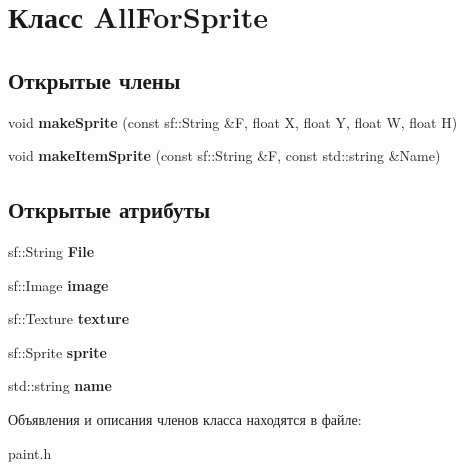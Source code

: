 \hypertarget{classAllForSprite}{}\section{Класс All\+For\+Sprite}
\label{classAllForSprite}
\subsection*{Открытые члены}
\begin{DoxyCompactItemize}
\item 
\mbox{\label{classAllForSprite_ae4498a5572c1e9f71817de7b4601cb02}} 
void {\bfseries make\+Sprite} (const sf\+::\+String \&F, float X, float Y, float W, float H)
\item 
\mbox{\label{classAllForSprite_af9eb7b8946920ca71fd9fc17be5778db}} 
void {\bfseries make\+Item\+Sprite} (const sf\+::\+String \&F, const std\+::string \&Name)
\end{DoxyCompactItemize}
\subsection*{Открытые атрибуты}
\begin{DoxyCompactItemize}
\item 
\mbox{\label{classAllForSprite_a08f4480fbeaa777af331b8cdf10973be}} 
sf\+::\+String {\bfseries File}
\item 
\mbox{\label{classAllForSprite_a355d87eb991806901495a62f502f5e15}} 
sf\+::\+Image {\bfseries image}
\item 
\mbox{\label{classAllForSprite_a6ad4e34d915672e25f9549e632fa30fc}} 
sf\+::\+Texture {\bfseries texture}
\item 
\mbox{\label{classAllForSprite_a4409cca7c2db2bea815c8a4cc42d9b95}} 
sf\+::\+Sprite {\bfseries sprite}
\item 
\mbox{\label{classAllForSprite_a4df788c7cf8de438fe59e1506b9a6c01}} 
std\+::string {\bfseries name}
\end{DoxyCompactItemize}


Объявления и описания членов класса находятся в файле\+:\begin{DoxyCompactItemize}
\item 
paint.\+h\end{DoxyCompactItemize}
